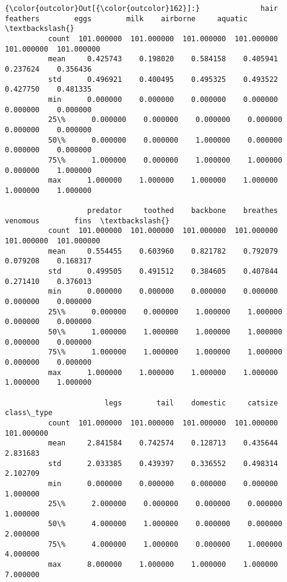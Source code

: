 \documentclass[11pt]{article}
\begin{document}
\begin{Verbatim}[commandchars=\\\{\}]
{\color{outcolor}Out[{\color{outcolor}162}]:}              hair    feathers        eggs        milk    airborne     aquatic  \textbackslash{}
          count  101.000000  101.000000  101.000000  101.000000  101.000000  101.000000   
          mean     0.425743    0.198020    0.584158    0.405941    0.237624    0.356436   
          std      0.496921    0.400495    0.495325    0.493522    0.427750    0.481335   
          min      0.000000    0.000000    0.000000    0.000000    0.000000    0.000000   
          25\%      0.000000    0.000000    0.000000    0.000000    0.000000    0.000000   
          50\%      0.000000    0.000000    1.000000    0.000000    0.000000    0.000000   
          75\%      1.000000    0.000000    1.000000    1.000000    0.000000    1.000000   
          max      1.000000    1.000000    1.000000    1.000000    1.000000    1.000000   
          
                   predator     toothed    backbone    breathes    venomous        fins  \textbackslash{}
          count  101.000000  101.000000  101.000000  101.000000  101.000000  101.000000   
          mean     0.554455    0.603960    0.821782    0.792079    0.079208    0.168317   
          std      0.499505    0.491512    0.384605    0.407844    0.271410    0.376013   
          min      0.000000    0.000000    0.000000    0.000000    0.000000    0.000000   
          25\%      0.000000    0.000000    1.000000    1.000000    0.000000    0.000000   
          50\%      1.000000    1.000000    1.000000    1.000000    0.000000    0.000000   
          75\%      1.000000    1.000000    1.000000    1.000000    0.000000    0.000000   
          max      1.000000    1.000000    1.000000    1.000000    1.000000    1.000000   
          
                       legs        tail    domestic     catsize  class\_type  
          count  101.000000  101.000000  101.000000  101.000000  101.000000  
          mean     2.841584    0.742574    0.128713    0.435644    2.831683  
          std      2.033385    0.439397    0.336552    0.498314    2.102709  
          min      0.000000    0.000000    0.000000    0.000000    1.000000  
          25\%      2.000000    0.000000    0.000000    0.000000    1.000000  
          50\%      4.000000    1.000000    0.000000    0.000000    2.000000  
          75\%      4.000000    1.000000    0.000000    1.000000    4.000000  
          max      8.000000    1.000000    1.000000    1.000000    7.000000  
\end{Verbatim}
            
\end{document}
